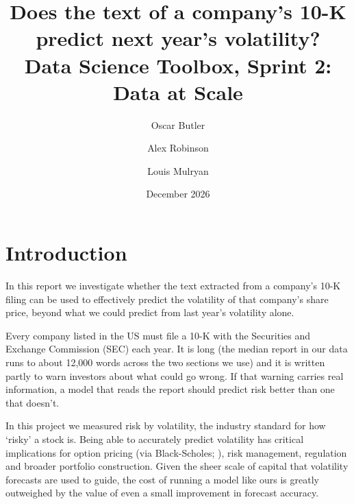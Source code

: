 \documentclass[11pt,a4paper]{article}
\title{Does the text of a company's 10-K predict next year's volatility?\\[2pt]
       \large Data Science Toolbox, Sprint 2: Data at Scale}
\author{Oscar Butler \and Alex Robinson \and Louis Mulryan}
\date{December 2026}
\newcommand{\placeholder}[1]{\textcolor{red}{[#1]}}
\begin{document}
\maketitle


\section{Introduction}\label{sec:intro}
In this report we investigate whether the text extracted from a company's 10-K filing can be used to effectively predict the volatility of that company's share price, beyond what we could predict from last year's volatility alone.

Every company listed in the US must file a 10-K with the Securities and Exchange Commission (SEC) each year. It is long (the median report in our data runs to about 12,000 words across the two sections we use) and it is written partly to warn investors about what could go wrong. If that warning carries real information, a model that reads the report should predict risk better than one that doesn't.

In this project we measured risk by volatility, the industry standard for how `risky' a stock is. Being able to accurately predict volatility has critical implications for option pricing (via Black-Scholes; \citealp{black1973}), risk management, regulation and broader portfolio construction. Given the sheer scale of capital that volatility forecasts are used to guide, the cost of running a model like ours is greatly outweighed by the value of even a small improvement in forecast accuracy.
\end{document}

